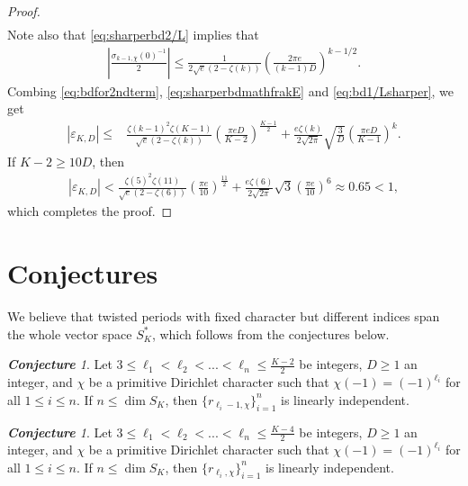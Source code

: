 \documentclass[11pt,letterpaper,reqno]{amsart}
\numberwithin{figure}{section}
\numberwithin{table}{section}
\theoremstyle{definition}
\theoremstyle{plain}
\theoremstyle{definition}
\theoremstyle{definition}
\theoremstyle{remark}
\newtheorem{conjecture}[theorem]{\bf Conjecture}
\numberwithin{equation}{section}
\theoremstyle{remark}
\begin{document}
\begin{proof}
\begin{align}
 \end{align}
Note also that \eqref{eq:sharperbd2/L} implies that 
    \begin{align}
        \left|\frac{\sigma_{k-1,\overline{\chi}}(0)^{-1}}{2}\right|\leq\frac{1}{2\sqrt{e}(2-\zeta(k))}\left(\frac{2\pi e}{(k-1)D}\right)^{k-1/2}.\label{eq:bd1/Lsharper}
    \end{align}
Combing \eqref{eq:bdfor2ndterm}, \eqref{eq:sharperbdmathfrakE} and \eqref{eq:bd1/Lsharper}, we get 
\begin{align*}
   |\varepsilon_{K,D}|\leq  &\frac{\zeta(k-1)^2\zeta(K-1)}{\sqrt{e}(2-\zeta(k))}\left(\frac{\pi eD}{K-2}\right)^{\frac{K-1}{2}}+   \frac{e\zeta(k)}{2\sqrt{2\pi}}\sqrt{\frac{3}{D}}\left(\frac{\pi e D}{K-1}\right)^k.
\end{align*}
If $K-2\geq 10D$, then  
\begin{align*}
    |\varepsilon_{K,D}|<\frac{\zeta(5)^2\zeta(11)}{\sqrt{e}(2-\zeta(6))}\left(\frac{\pi e}{10}\right)^{\frac{11}{2}}+   \frac{e\zeta(6)}{2\sqrt{2\pi}}\sqrt{3}\left(\frac{\pi e }{10}\right)^6\approx0.65<1,
\end{align*}
which completes the proof.
\end{proof}

\section{Conjectures}\label{sect:conj}
We believe that twisted periods with fixed character but different indices span the whole vector space $S_K^{\ast}$, which follows from the conjectures below. 
\begin{conjecture}\label{conj:differentindice}
 Let $3\leq\ell_1<\ell_2<...<\ell_n\leq \frac{K-2}{2}$ be integers,
 $D\geq1$ an integer, and $\chi$ be a primitive Dirichlet character such that $\chi(-1)=(-1)^{\ell_i}$ for all $1\leq i\leq n$.  If $n\leq\dim S_K$, then $\{r_{\ell_i-1,\chi}\}_{i=1}^{n}$  is linearly independent.
\end{conjecture}
\begin{conjecture}\label{conj:differentindicebracket}
  Let $3\leq\ell_1<\ell_2<...<\ell_n\leq\frac{K-4}{2}$ be integers, $D\geq1$ an integer, and $\chi$ be a primitive Dirichlet character such that $\chi(-1)=(-1)^{\ell_i}$ for all $1\leq i\leq n$.  If $n\leq\dim S_K$, then $\{r_{\ell_i,\chi}\}_{i=1}^{n}$  is linearly independent.  
\end{conjecture}
\end{document}
